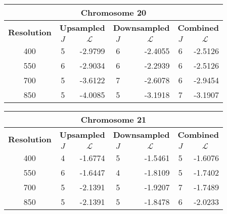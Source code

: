 \begin{table}[h!]
  \centering
\begin{tabular}{|c|c|r|c|r|c|r|}\hline
\multicolumn{7}{|c|}{\textbf{Chromosome 20}} \\ \hline
\multirow{2}{*}{\textbf{Resolution}} & \multicolumn{2}{|c|}{\textbf{Upsampled}} &  \multicolumn{2}{|c|}{\textbf{Downsampled}} &  \multicolumn{2}{|c|}{\textbf{Combined}} \\ \cline{2-7}
    & $J$ & \multicolumn{1}{|c|}{\textbf{$\mathcal{L}$}} & $J$ & \multicolumn{1}{|c|}{\textbf{$\mathcal{L}$}} &$J$ & \multicolumn{1}{|c|}{\textbf{$\mathcal{L}$}}   \\ \hline
400 & 5 & -2.9799 & 6 & -2.4055 & 6 & -2.5126  \\ \hline
550 & 6 & -2.9034 & 6 & -2.2939 & 6 & -2.5126  \\ \hline
700 & 5 & -3.6122 & 7 & -2.6078 & 6 & -2.9454  \\ \hline
850 & 5 & -4.0085 & 5 & -3.1918 & 7 & -3.1907 \\ \hline
\end{tabular}
\end{table}

\begin{table}[h!]
  \centering
\begin{tabular}{|c|c|r|c|r|c|r|}\hline
\multicolumn{7}{|c|}{\textbf{Chromosome 21}} \\ \hline
\multirow{2}{*}{\textbf{Resolution}} & \multicolumn{2}{|c|}{\textbf{Upsampled}} &  \multicolumn{2}{|c|}{\textbf{Downsampled}} &  \multicolumn{2}{|c|}{\textbf{Combined}} \\ \cline{2-7}
    & $J$ & \multicolumn{1}{|c|}{\textbf{$\mathcal{L}$}} & $J$ & \multicolumn{1}{|c|}{\textbf{$\mathcal{L}$}} &$J$ & \multicolumn{1}{|c|}{\textbf{$\mathcal{L}$}}   \\ \hline
400 & 4 & -1.6774 & 5 & -1.5461 & 5 & -1.6076  \\ \hline
550 & 6 & -1.6447 & 4 & -1.8109 & 5 & -1.7402  \\ \hline
700 & 5 & -2.1391 & 5 & -1.9207 & 7 & -1.7489  \\ \hline
850 & 5 & -2.1391 & 5 & -1.8478 & 6 & -2.0233  \\ \hline
\end{tabular}
\end{table}

\clearpage

